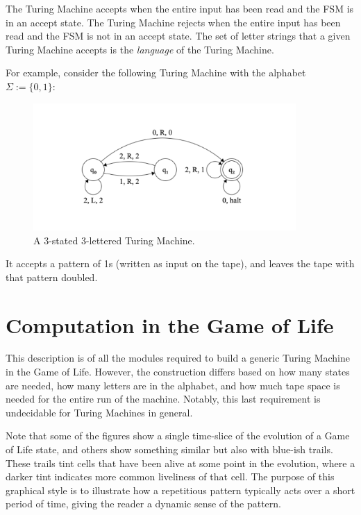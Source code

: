 \documentclass{article}
\begin{document}
The Turing Machine accepts when the entire input has been read and the FSM is in an accept state. The Turing Machine rejects when the entire input has been read and the FSM is not in an accept state. The set of letter strings that a given Turing Machine accepts is the \textit{language} of the Turing Machine.





For example, consider the following Turing Machine with the alphabet $  \Sigma := \{ 0, 1 \}  $:



\begin{figure}[h]
\centering
\includegraphics[width=10cm,keepaspectratio]{images/TM-example.png}
\captionsetup{labelformat=empty} \caption{A 3-stated 3-lettered Turing Machine.}
\end{figure}



It accepts a pattern of 1s (written as input on the tape), and leaves the tape with that pattern doubled. 


\section{Computation in the Game of Life}


This description is of all the modules required to build a generic Turing Machine in the Game of Life. However, the construction differs based on how many states are needed, how many letters are in the alphabet, and how much tape space is needed for the entire run of the machine. Notably, this last requirement is undecidable for Turing Machines in general.





Note that some of the figures show a single time-slice of the evolution of a Game of Life state, and others show something similar but also with blue-ish trails. These trails tint cells that have been alive at some point in the evolution, where a darker tint indicates more common liveliness of that cell. The purpose of this graphical style is to illustrate how a repetitious pattern typically acts over a short period of time, giving the reader a dynamic sense of the pattern.
\end{document}
